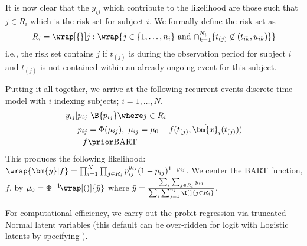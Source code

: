 \documentclass[article]{jss}
\begin{document}
It is now clear that the $y_{ij}$
which contribute to the likelihood are those such that %
$j \in R_i$ which is the risk set for subject $i$.
We formally define the risk set as
\begin{align*} 
R_i = \wrap[\{\}]{j : \wrap{ j \in \{1, \dots, n_i\} \mbox{\
and\ } {\cap_{k=1}^{N_i} \{t_{(j)} \not\in (t_{ik}, u_{ik}) \} } } }
\end{align*}
i.e., the risk set contains $j$ if $t_{(j)}$ is during the observation
period for subject $i$ and $t_{(j)}$ is not contained within an
already ongoing event for this subject.

Putting it all together, we arrive at the following recurrent events
discrete-time model with $i$ indexing subjects; $i=1, \dots, N$.
\begin{align}\label{recur}
y_{ij}|p_{ij} & ~  \B{p_{ij}} \where j \in R_i \notag \\
p_{ij} & = \Phi(\mu_{ij}),\ \mu_{ij} =\mu_0+f(t_{(j)}, \tilde{\bm{x}}_i(t_{(j)})) \\ %
f & \prior \mathrm{BART} \notag
\end{align}
This produces the following likelihood:
$\wrap{\bm{y}|f} = \prod_{i=1}^N\prod_{j \in R_i} p_{ij}^{y_{ij}}
(1-p_{ij})^{1-y_{ij}}$.
We center the BART function, $f$, %
by $\mu_0=\Phi^{-1}\!\wrap[()]{\bar{y}}$ where
$\bar{y}=\frac{\sum_i \sum_{j \in R_i} y_{ij}} {\sum_i
  \sum_{j=1}^{n_i} \I[\,]{j \in R_i}}$.

For computational efficiency, we carry out the probit regression via
truncated Normal latent variables %
\citep{AlbeChib93} (this default can be over-ridden for logit with
Logistic latents \citep{HolmHeld06,GramPols12} by specifying
).
\end{document}
